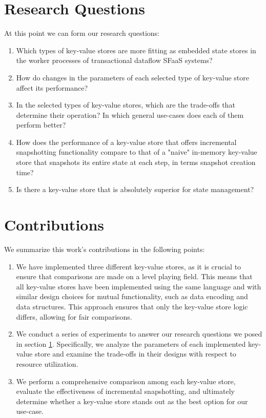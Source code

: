 \section{Research Questions}
\label{section-reseach-questions}

At this point we can form our research questions:

\begin{enumerate}
    \item Which types of key-value stores are more fitting as embedded state stores in the worker processes of transactional dataflow SFaaS systems?
    \item How do changes in the parameters of each selected type of key-value store affect its performance?
    \item In the selected types of key-value stores, which are the trade-offs that determine their operation? In which general use-cases does each of them perform better?
    \item How does the performance of a key-value store that offers incremental snapshotting functionality compare to that of a "naive" in-memory key-value store that snapshots its entire state at each step, in terms snapshot creation time?
    \item Is there a key-value store that is absolutely superior for state management? %
\end{enumerate}

\section{Contributions}

We summarize this work's contributions in the following points:

\begin{enumerate}
    \item We have implemented three different key-value stores, as it is crucial to ensure that comparisons are made on a level playing field. This means that all key-value stores have been implemented using the same language and with similar design choices for mutual functionality, such as data encoding and data structures. This approach ensures that only the key-value store logic differs, allowing for fair comparisons.
    
    \item We conduct a series of experiments to answer our research questions we posed in section \ref{section-reseach-questions}. Specifically, we analyze the parameters of each implemented key-value store and examine the trade-offs in their designs with respect to resource utilization. 

    \item We perform a comprehensive comparison among each key-value store, evaluate the effectiveness of incremental snapshotting, and ultimately determine whether a key-value store stands out as the best option for our use-case.
\end{enumerate}


